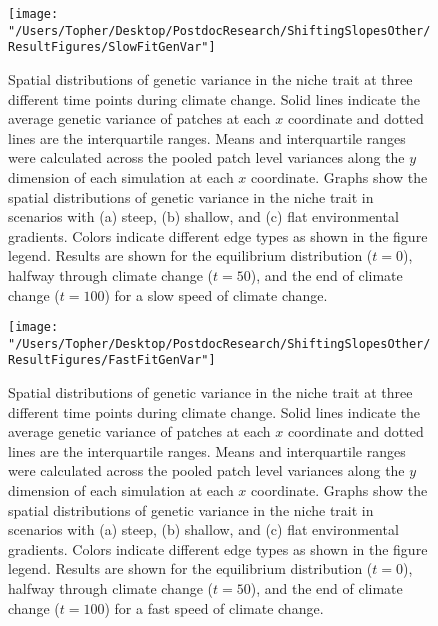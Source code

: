 \documentclass[11pt]{article}
\begin{document}
\begin{figure}[h!]
\texttt{[image: "/Users/Topher/Desktop/PostdocResearch/ShiftingSlopesOther/ResultFigures/SlowFitGenVar"]}
\caption{Spatial distributions of genetic variance in the niche trait at three different time points during climate change. Solid lines indicate the average genetic variance of patches at each $x$ coordinate and dotted lines are the interquartile ranges. Means and interquartile ranges were calculated across the pooled patch level variances along the $y$ dimension of each simulation at each $x$ coordinate. Graphs show the spatial distributions of genetic variance in the niche trait in scenarios with (a) steep, (b) shallow, and (c) flat environmental gradients. Colors indicate different edge types as shown in the figure legend. Results are shown for the equilibrium distribution ($t = 0$), halfway through climate change ($t = 50$), and the end of climate change ($t = 100$) for a slow speed of climate change.}
\label{Fig:FitGenVarSlow}
\end{figure}

\clearpage

\begin{figure}[h!]
\texttt{[image: "/Users/Topher/Desktop/PostdocResearch/ShiftingSlopesOther/ResultFigures/FastFitGenVar"]}
\caption{Spatial distributions of genetic variance in the niche trait at three different time points during climate change. Solid lines indicate the average genetic variance of patches at each $x$ coordinate and dotted lines are the interquartile ranges. Means and interquartile ranges were calculated across the pooled patch level variances along the $y$ dimension of each simulation at each $x$ coordinate. Graphs show the spatial distributions of genetic variance in the niche trait in scenarios with (a) steep, (b) shallow, and (c) flat environmental gradients. Colors indicate different edge types as shown in the figure legend. Results are shown for the equilibrium distribution ($t = 0$), halfway through climate change ($t = 50$), and the end of climate change ($t = 100$) for a fast speed of climate change.}
\label{Fig:FitGenVarFast}
\end{figure}
\end{document}
